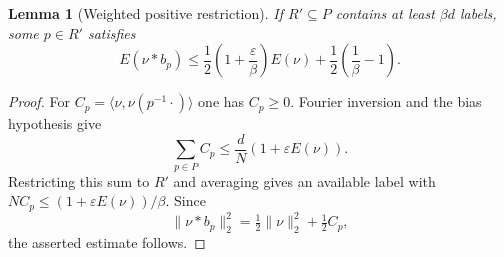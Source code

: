 \documentclass[11pt,a4paper]{article}
\newtheorem{lemma}[theorem]{Lemma}
\theoremstyle{definition}
\theoremstyle{remark}
\begin{document}
\begin{lemma}[Weighted positive restriction]
If $R'\subseteq P$ contains at least $\beta d$ labels, some $p\in R'$
satisfies
\begin{equation}\label{p-eq:weighted-positive}
 E(\nu*b_p)\leq
 \frac12\left(1+\frac\varepsilon\beta\right)E(\nu)
 +\frac12\left(\frac1\beta-1\right).
\end{equation}
\end{lemma}
\begin{proof}
For $C_p=\langle\nu,\nu(p^{-1}\cdot)\rangle$ one has $C_p\geq0$.
Fourier inversion and the bias hypothesis give
\[
 \sum_{p\in P}C_p\leq\frac dN(1+\varepsilon E(\nu)).
\]
Restricting this sum to $R'$ and averaging gives an available label with
$NC_p\leq(1+\varepsilon E(\nu))/\beta$.
Since
\[
 \|\nu*b_p\|_2^2=\tfrac12\|\nu\|_2^2+\tfrac12 C_p,
\]
the asserted estimate follows.
\end{proof}
\end{document}
